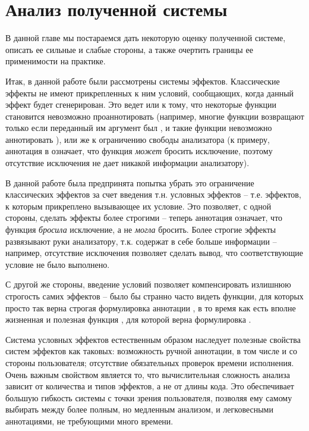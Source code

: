 \section{Анализ полученной системы}

В данной главе мы постараемся дать некоторую оценку полученной системе, описать ее сильные и слабые стороны, а также очертить границы ее применимости на практике. 

Итак, в данной работе были рассмотрены системы эффектов. Классические эффекты не имеют прикрепленных к ним условий, сообщающих, когда данный эффект будет сгенерирован. Это ведет или к тому, что некоторые функции становится невозможно проаннотировать (например, многие функции возвращают  только если переданный им аргумент был , и такие функции невозможно аннотировать ), или же к ограничению свободы анализатора (к примеру, аннотация  в  означает, что функция \emph{может} бросить исключение, поэтому отсутствие исключения не дает никакой информации анализатору).

В данной работе была предпринята попытка убрать это ограничение классических эффектов за счет введения т.н. условных эффектов -- т.е. эффектов, к которым прикреплено вызывающее их условие. Это позволяет, с одной стороны, сделать эффекты более строгими -- теперь аннотация  означает, что функция \emph{бросила} исключение, а не \emph{могла} бросить. Более строгие эффекты развязывают руки анализатору, т.к. содержат в себе больше информации -- например, отсутствие исключения позволяет сделать вывод, что соответствующие условие не было выполнено. 

С другой же стороны, введение условий позволяет компенсировать излишнюю строгость самих эффектов -- было бы странно часто видеть функции, для которых просто так верна строгая формулировка аннотации , в то время как есть вполне жизненная и полезная функция , для которой верна формулировка .

Система условных эффектов естественным образом наследует полезные свойства систем эффектов как таковых: возможность ручной аннотации, в том числе и со стороны пользователя; отсутствие обязательных проверок времени исполнения. Очень важным свойством является то, что вычислительная сложность анализа зависит от количества и типов эффектов, а не от длины кода. Это обеспечивает большую гибкость системы с точки зрения пользователя, позволяя ему самому выбирать между более полным, но медленным анализом, и легковесными аннотациями, не требующими много времени. 

